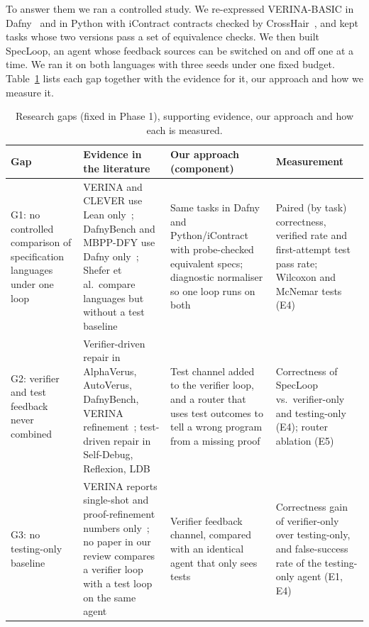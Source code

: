 To answer them we ran a controlled study. We re-expressed VERINA-BASIC in Dafny~\cite{leino2010dafny} and in Python with iContract contracts checked by CrossHair~\cite{crosshair}, and kept \NTASKS{} tasks whose two versions pass a set of equivalence checks. We then built SpecLoop, an agent whose feedback sources can be switched on and off one at a time. We ran it on both languages with three seeds under one fixed budget. Table~\ref{tab:gaps} lists each gap together with the evidence for it, our approach and how we measure it.

\begin{table}[t]
\centering
\caption{Research gaps (fixed in Phase 1), supporting evidence, our approach and how each is measured.}
\label{tab:gaps}
\footnotesize
\begin{tabular}{p{}p{}p{}p{}}
\toprule
Gap & Evidence in the literature & Our approach (component) & Measurement \\
\midrule
G1: no controlled comparison of specification languages under one loop &
VERINA and CLEVER use Lean only~\cite{ye2026verina,thakur2025clever}; DafnyBench and MBPP-DFY use Dafny only~\cite{loughridge2025dafnybench,misu2024dafnysynthesis}; Shefer et al.\ compare languages but without a test baseline~\cite{shefer2025mainstream} &
Same tasks in Dafny and Python/iContract with probe-checked equivalent specs; diagnostic normaliser so one loop runs on both &
Paired (by task) correctness, verified rate and first-attempt test pass rate; Wilcoxon and McNemar tests (E4) \\
G2: verifier and test feedback never combined &
Verifier-driven repair in AlphaVerus, AutoVerus, DafnyBench, VERINA refinement~\cite{aggarwal2025alphaverus,yang2025autoverus,loughridge2025dafnybench,ye2026verina}; test-driven repair in Self-Debug, Reflexion, LDB~\cite{chen2024selfdebug,shinn2023reflexion,zhong2024ldb} &
Test channel added to the verifier loop, and a router that uses test outcomes to tell a wrong program from a missing proof &
Correctness of SpecLoop vs.\ verifier-only and testing-only (E4); router ablation (E5) \\
G3: no testing-only baseline &
VERINA reports single-shot and proof-refinement numbers only~\cite{ye2026verina}; no paper in our review compares a verifier loop with a test loop on the same agent &
Verifier feedback channel, compared with an identical agent that only sees tests &
Correctness gain of verifier-only over testing-only, and false-success rate of the testing-only agent (E1, E4) \\
\bottomrule
\end{tabular}
\end{table}

